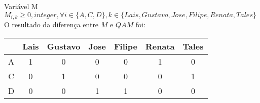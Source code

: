 \documentclass{article}
\begin{document}
	Variável M \\
    $M_{i,k} \geq 0, integer, \forall i \in \{A,C,D\}, k \in \{Lais,Gustavo,Jose,Filipe,Renata,Tales\}$ \\

	O resultado da diferença entre $M$ e $QAM$ foi: \\
	
	\begin{tabular}{c|cccccc}
		&	Lais &	Gustavo &	Jose &	Filipe &	Renata &	Tales \\ \hline
		A &	1	 &  0 		&	0	 & 	0      &  	1	   &	0 \\
		C &	0	 &  1 		&	0	 & 	0      &  	0	   &	1 \\
		D &	0	 &  0 		&	1	 & 	1      &  	0	   &	0 \\
	\end{tabular}
\end{document}
